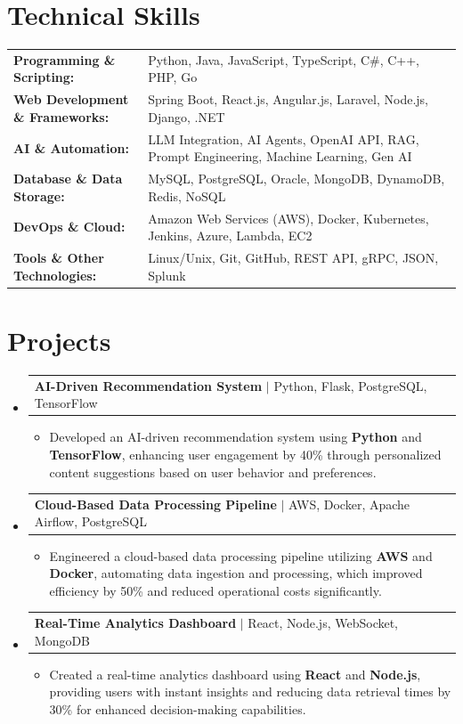 \documentclass[letterpaper,10pt]{article}
\makeatletter
\newcommand{\resumeItem}[1]{
  \item{\fontsize{8pt}{9pt}\selectfont
    #1 \vspace{-3pt}
  }
}
\newcommand{\resumeProjectHeading}[2]{
    \item
    \begin{tabular*}{1.001\textwidth}{l@{\extracolsep{\fill}}r}
      \fontsize{8.5pt}{10pt}#1 & \textbf{\fontsize{8.5pt}{10pt} #2}\\
    \end{tabular*}\vspace{-7pt}
}
\newcommand{\resumeSubHeadingListStart}{\begin{itemize}[leftmargin=0pt, label={}]}
\newcommand{\resumeSubHeadingListEnd}{\end{itemize}}
\newcommand{\resumeItemListStart}{\begin{itemize}[leftmargin=*]}
\newcommand{\resumeItemListEnd}{\end{itemize}\vspace{-5pt}}
\makeatother
\begin{document}
\section{Technical Skills}
        \vspace{-14pt}
        \begin{table}[h]
            \fontsize{8pt}{9pt}\selectfont
            \begin{tabular}{p{0.3\linewidth} p{0.7\linewidth}}
                \textbf{Programming \& Scripting:} & Python, Java, JavaScript, TypeScript, C\#, C++, PHP, Go \\
                \textbf{Web Development \& Frameworks:} & Spring Boot, React.js, Angular.js, Laravel, Node.js, Django, .NET \\
                \textbf{AI \& Automation:} & LLM Integration, AI Agents, OpenAI API, RAG, Prompt Engineering, Machine Learning, Gen AI \\
                \textbf{Database \& Data Storage:} & MySQL, PostgreSQL, Oracle, MongoDB, DynamoDB, Redis, NoSQL \\
                \textbf{DevOps \& Cloud:} & Amazon Web Services (AWS), Docker, Kubernetes, Jenkins, Azure, Lambda, EC2 \\
                \textbf{Tools \& Other Technologies:} & Linux/Unix, Git, GitHub, REST API, gRPC, JSON, Splunk \\
            \end{tabular}
        \end{table}
 \vspace{-18pt}

\section{Projects}
    \vspace{-5pt}
    \resumeSubHeadingListStart
          \resumeProjectHeading
            {\textbf{AI-Driven Recommendation System} $|$ Python, Flask, PostgreSQL, TensorFlow}{}
            \resumeItemListStart
                \resumeItem{Developed an AI-driven recommendation system using \textbf{Python} and \textbf{TensorFlow}, enhancing user engagement by 40\% through personalized content suggestions based on user behavior and preferences.}
            \resumeItemListEnd
        \vspace{-12pt}
    
        \resumeProjectHeading
            {\textbf{Cloud-Based Data Processing Pipeline} $|$ AWS, Docker, Apache Airflow, PostgreSQL}{}
        \resumeItemListStart
                \resumeItem{Engineered a cloud-based data processing pipeline utilizing \textbf{AWS} and \textbf{Docker}, automating data ingestion and processing, which improved efficiency by 50\% and reduced operational costs significantly.}
        \resumeItemListEnd
      \vspace{-12pt}
      \resumeProjectHeading
        {\textbf{Real-Time Analytics Dashboard} $|$ React, Node.js, WebSocket, MongoDB}{}
    \resumeItemListStart
            \resumeItem{Created a real-time analytics dashboard using \textbf{React} and \textbf{Node.js}, providing users with instant insights and reducing data retrieval times by 30\% for enhanced decision-making capabilities.}
    \resumeItemListEnd
    \resumeSubHeadingListEnd
\end{document}
